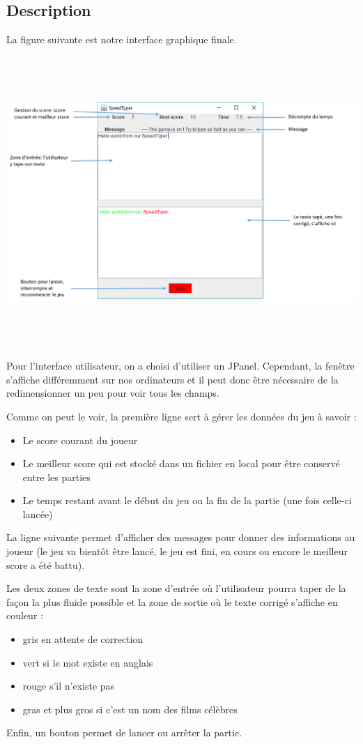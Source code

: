 \documentclass[a4paper,11pt]{article}
\begin{document}
\subsection{Description}
La figure suivante est notre interface graphique finale.\par
\begin{center}
\includegraphics[width = 17cm, height = 11cm]{interfaceGraphique.png}
\end{center}\par
Pour l'interface utilisateur, on a choisi d'utiliser un JPanel. Cependant, la fenêtre s'affiche différemment sur nos ordinateurs et il peut donc être nécessaire de la redimensionner un peu pour voir tous les champs.\par
Comme on peut le voir, la première ligne sert à gérer les données du jeu à savoir :
\begin{itemize}
\item Le score courant du joueur
\item Le meilleur score qui est stocké dans un fichier en local pour être conservé entre les parties
\item Le temps restant avant le début du jeu ou la fin de la partie (une fois celle-ci lancée)
\end{itemize}\par
La ligne suivante permet d'afficher des messages pour donner des informations au joueur (le jeu va bientôt être lancé, le jeu est fini, en cours ou encore le meilleur score a été battu).\par
Les deux zones de texte sont la zone d'entrée où l'utilisateur pourra taper de la façon la plus fluide possible et la zone de sortie où le texte corrigé s'affiche en couleur :
\begin{itemize}
\item gris en attente de correction
\item vert si le mot existe en anglais
\item rouge s'il n'existe pas
\item gras et plus gros si c'est un nom des films célèbres
\end{itemize}\par
Enfin, un bouton permet de lancer ou arrêter la partie.
\end{document}
